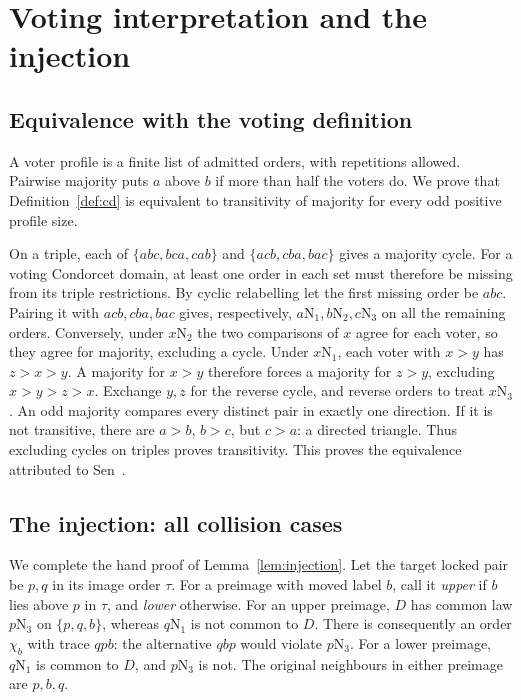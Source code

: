 \documentclass[11pt,letterpaper]{article}
\theoremstyle{definition}
\newcommand{\N}[2]{#1\mathrm N_{#2}}
\begin{document}
\clearpage
\appendix
\section{Voting interpretation and the injection}\label{app:elementary}
\subsection{Equivalence with the voting definition}\label{app:voting}
A voter profile is a finite list of admitted orders, with repetitions
allowed. Pairwise majority puts \(a\) above \(b\) if more than half
the voters do. We prove that Definition~\ref{def:cd} is equivalent to
transitivity of majority for every odd positive profile size.

On a triple, each of \(\{abc,bca,cab\}\) and
\(\{acb,cba,bac\}\) gives a majority cycle. For a voting Condorcet
domain, at least one order in each set must therefore be missing from
its triple restrictions. By cyclic relabelling let the first missing
order be \(abc\). Pairing it with \(acb,cba,bac\) gives, respectively,
\(\N a1,\N b2,\N c3\) on all the remaining orders.
Conversely, under \(\N x2\) the two comparisons of \(x\) agree for
each voter, so they agree for majority, excluding a cycle.
Under \(\N x1\), each voter with \(x>y\) has \(z>x>y\).
A majority for \(x>y\) therefore forces a majority for \(z>y\),
excluding \(x>y>z>x\). Exchange \(y,z\) for the reverse cycle,
and reverse orders to treat \(\N x3\). An odd majority compares
every distinct pair in exactly one direction. If it is not transitive,
there are \(a>b\), \(b>c\), but \(c>a\): a directed triangle.
Thus excluding cycles on triples proves transitivity. This proves the
equivalence attributed to Sen~\cite{Sen}.

\subsection{The injection: all collision cases}\label{app:collisions}
We complete the hand proof of Lemma~\ref{lem:injection}.
Let the target locked pair be \(p,q\) in its image order \(\tau\).
For a preimage with moved label \(b\), call it \emph{upper} if \(b\)
lies above \(p\) in \(\tau\), and \emph{lower} otherwise.
For an upper preimage, \(D\) has common law \(\N p3\) on
\(\{p,q,b\}\), whereas \(\N q1\) is not common to \(D\). There is consequently an order \(\chi_b\) with
trace \(qpb\): the alternative \(qbp\) would violate \(\N p3\).
For a lower preimage, \(\N q1\) is common to \(D\), and \(\N p3\) is not.
The original neighbours in either preimage are \(p,b,q\).
\end{document}
